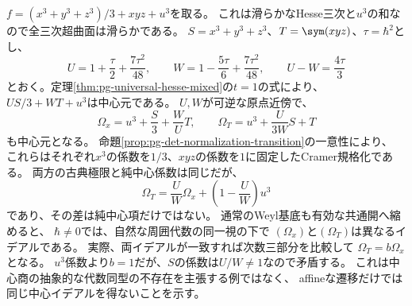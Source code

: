 \begin{example}[規格化の変更と中心三次イデアル]
\label{ex:pg-det-distinct-normalized-ideals}
$f=(x^3+y^3+z^3)/3+xyz+u^3$を取る。
これは滑らかなHesse三次と$u^3$の和なので全三次超曲面は滑らかである。
$S=x^3+y^3+z^3$、$T=\sym(xyz)$、$\tau=\hbar^2$とし、
\begin{equation}
 U=1+\frac{\tau}{2}+\frac{7\tau^2}{48},\qquad
 W=1-\frac{5\tau}{6}+\frac{7\tau^2}{48},\qquad
 U-W=\frac{4\tau}{3}
 \label{eq:pg-det-hesse-transition-coefficients}
\end{equation}
とおく。定理\ref{thm:pg-universal-hesse-mixed}の$t=1$の式により、
$US/3+WT+u^3$は中心元である。
$U,W$が可逆な原点近傍で、
\begin{equation}
 \Omega_x=u^3+\frac S3+\frac WU T,\qquad
 \Omega_T=u^3+\frac U{3W}S+T
 \label{eq:pg-det-hesse-normalized-centers}
\end{equation}
も中心元となる。
命題\ref{prop:pg-det-normalization-transition}の一意性により、
これらはそれぞれ$x^3$の係数を$1/3$、$xyz$の係数を$1$に固定したCramer規格化である。
両方の古典極限と純中心係数は同じだが、
\begin{equation}
 \Omega_T=\frac UW\Omega_x+
 \left(1-\frac UW\right)u^3
 \label{eq:pg-det-hesse-affine-transition}
\end{equation}
であり、その差は純中心項だけではない。
通常のWeyl基底も有効な共通開へ縮めると、
$\hbar\ne0$では、自然な周囲代数の同一視の下で
$(\Omega_x)$と$(\Omega_T)$は異なるイデアルである。
実際、両イデアルが一致すれば次数三部分を比較して
$\Omega_T=b\Omega_x$となる。
$u^3$係数より$b=1$だが、$S$の係数は$U/W\ne1$なので矛盾する。
これは中心商の抽象的な代数同型の不存在を主張する例ではなく、
affineな遷移だけでは同じ中心イデアルを得ないことを示す。
\end{example}


